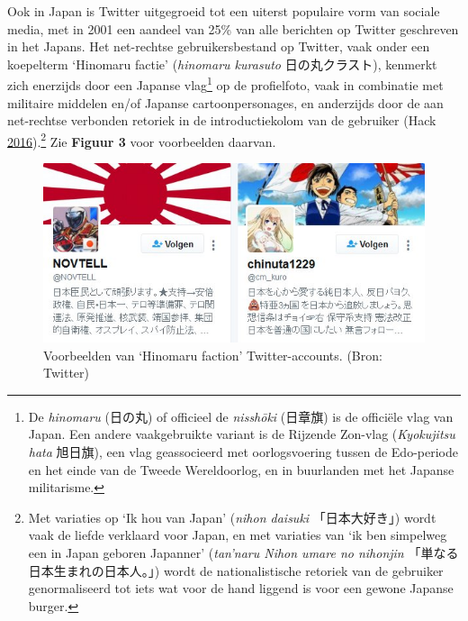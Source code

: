 \documentclass[10.5pt,dutch,]{article}
\begin{document}
Ook in Japan is Twitter uitgegroeid tot een uiterst populaire vorm van
sociale media, met in 2001 een aandeel van 25\% van alle berichten op
Twitter geschreven in het Japans. Het net-rechtse gebruikersbestand op
Twitter, vaak onder een koepelterm `Hinomaru factie' (\emph{hinomaru
kurasuto} 日の丸クラスト), kenmerkt zich enerzijds door een Japanse
vlag\footnote{De \emph{hinomaru} (日の丸) of officieel de
  \emph{nisshōki} (日章旗) is de officiële vlag van Japan. Een andere
  vaakgebruikte variant is de Rijzende Zon-vlag (\emph{Kyokujitsu hata}
  旭日旗), een vlag geassocieerd met oorlogsvoering tussen de
  Edo-periode en het einde van de Tweede Wereldoorlog, en in buurlanden
  met het Japanse militarisme.} op de profielfoto, vaak in combinatie
met militaire middelen en/of Japanse cartoonpersonages, en anderzijds
door de aan net-rechtse verbonden retoriek in de introductiekolom van de
gebruiker (Hack
\protect\hyperlink{ref-hackux5fsubcultureux5f2016}{2016}).\footnote{Met
  variaties op `Ik hou van Japan' (\emph{nihon daisuki} 「日本大好き」)
  wordt vaak de liefde verklaard voor Japan, en met variaties van `ik
  ben simpelweg een in Japan geboren Japanner' (\emph{tan'naru Nihon
  umare no nihonjin} 「単なる日本生まれの日本人。」) wordt de
  nationalistische retoriek van de gebruiker genormaliseerd tot iets wat
  voor de hand liggend is voor een gewone Japanse burger.} Zie
\textbf{Figuur 3} voor voorbeelden daarvan.

\begin{figure}[htbp]
\centering
\includegraphics{images/twitter_hinomaru_crest.jpg}
\caption{Voorbeelden van `Hinomaru faction' Twitter-accounts. (Bron:
Twitter)}
\end{figure}
\end{document}

